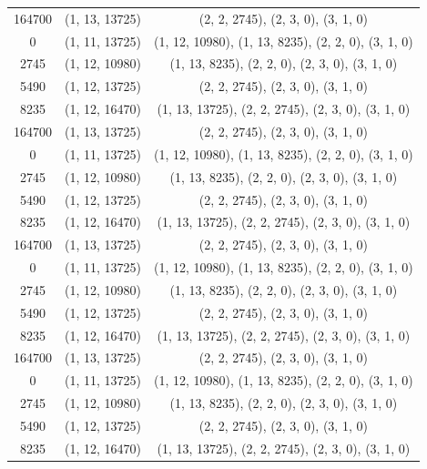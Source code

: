 \begin{center}
\begin{longtable}{ccc}
		164700 & (1, 13, 13725) & (2, 2, 2745), (2, 3, 0), (3, 1, 0) \\
		0      & (1, 11, 13725) & (1, 12, 10980), (1, 13, 8235), (2, 2, 0), (3, 1, 0) \\
		2745   & (1, 12, 10980) & (1, 13, 8235), (2, 2, 0), (2, 3, 0), (3, 1, 0) \\
		5490   & (1, 12, 13725) & (2, 2, 2745), (2, 3, 0), (3, 1, 0) \\
		8235   & (1, 12, 16470) & (1, 13, 13725), (2, 2, 2745), (2, 3, 0), (3, 1, 0) \\
		164700 & (1, 13, 13725) & (2, 2, 2745), (2, 3, 0), (3, 1, 0) \\
		0      & (1, 11, 13725) & (1, 12, 10980), (1, 13, 8235), (2, 2, 0), (3, 1, 0) \\
		2745   & (1, 12, 10980) & (1, 13, 8235), (2, 2, 0), (2, 3, 0), (3, 1, 0) \\
		5490   & (1, 12, 13725) & (2, 2, 2745), (2, 3, 0), (3, 1, 0) \\
		8235   & (1, 12, 16470) & (1, 13, 13725), (2, 2, 2745), (2, 3, 0), (3, 1, 0) \\
		164700 & (1, 13, 13725) & (2, 2, 2745), (2, 3, 0), (3, 1, 0) \\
		0      & (1, 11, 13725) & (1, 12, 10980), (1, 13, 8235), (2, 2, 0), (3, 1, 0) \\
		2745   & (1, 12, 10980) & (1, 13, 8235), (2, 2, 0), (2, 3, 0), (3, 1, 0) \\
		5490   & (1, 12, 13725) & (2, 2, 2745), (2, 3, 0), (3, 1, 0) \\
		8235   & (1, 12, 16470) & (1, 13, 13725), (2, 2, 2745), (2, 3, 0), (3, 1, 0) \\
		164700 & (1, 13, 13725) & (2, 2, 2745), (2, 3, 0), (3, 1, 0) \\
		0      & (1, 11, 13725) & (1, 12, 10980), (1, 13, 8235), (2, 2, 0), (3, 1, 0) \\
		2745   & (1, 12, 10980) & (1, 13, 8235), (2, 2, 0), (2, 3, 0), (3, 1, 0) \\
		5490   & (1, 12, 13725) & (2, 2, 2745), (2, 3, 0), (3, 1, 0) \\
		8235   & (1, 12, 16470) & (1, 13, 13725), (2, 2, 2745), (2, 3, 0), (3, 1, 0) \\
	\end{longtable}
\end{center}